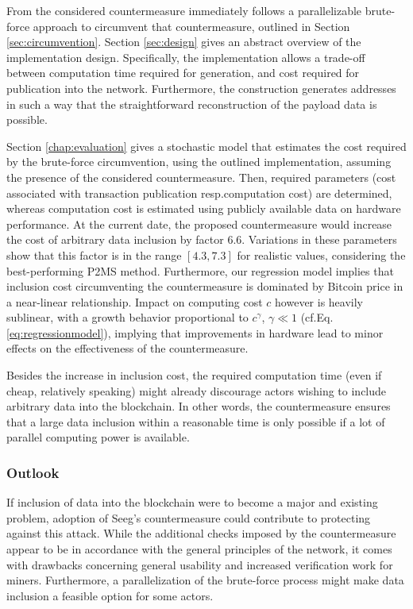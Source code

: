 \documentclass[a4paper,11pt,titlepage]{scrbook}
\begin{document}
From the considered countermeasure immediately follows a parallelizable brute-force approach to circumvent that countermeasure, outlined in Section \ref{sec:circumvention}. Section \ref{sec:design} gives an abstract overview of the implementation design.
Specifically, the implementation allows a trade-off between computation time required for generation, and cost required for publication into the network.
Furthermore, the construction generates addresses in such a way that the straightforward reconstruction of the payload data is possible.

Section \ref{chap:evaluation} gives a stochastic model that estimates the cost required by the brute-force circumvention, using the outlined implementation, assuming the presence of the considered countermeasure.
Then, required parameters (cost associated with transaction publication resp.\@ computation cost) are determined, whereas computation cost is estimated using publicly available data on hardware performance.
At the current date, the proposed countermeasure would increase the cost of arbitrary data inclusion by factor \num{6.6}.
Variations in these parameters show that this factor is in the range $[\num{4.3}, \num{7.3}]$ for realistic values, considering the best-performing P2MS method.
Furthermore, our regression model implies that inclusion cost circumventing the countermeasure is dominated by Bitcoin price in a near-linear relationship.
Impact on computing cost $c$ however is heavily sublinear, with a growth behavior proportional to $c^\gamma$, $\gamma \ll 1$ (cf.\@ Eq.\@ \ref{eq:regressionmodel}), implying that improvements in hardware lead to minor effects on the effectiveness of the countermeasure.

Besides the increase in inclusion cost, the required computation time (even if cheap, relatively speaking) might already discourage actors wishing to include arbitrary data into the blockchain.
In other words, the countermeasure ensures that a large data inclusion within a reasonable time is only possible if a lot of parallel computing power is available.

\subsubsection*{Outlook}

If inclusion of data into the blockchain were to become a major and existing problem, adoption of Seeg's countermeasure could contribute to protecting against this attack.
While the additional checks imposed by the countermeasure appear to be in accordance with the general principles of the network, it comes with drawbacks concerning general usability and increased verification work for miners.
Furthermore, a parallelization of the brute-force process might make data inclusion a feasible option for some actors.
\end{document}
